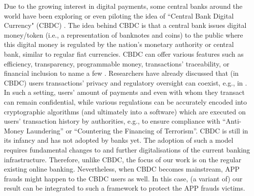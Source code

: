 Due to the growing interest in digital payments, some central banks around the world have been exploring or even piloting the idea of ``Central Bank Digital Currency" (CBDC) \cite{CBDC}.  The idea behind CBDC is that a central bank issues digital money/token (i.e., a representation of banknotes and coins) to the public where this digital money is regulated by the nation's monetary authority or central bank, similar to regular fiat currencies. CBDC can offer various features such as efficiency, transparency, programmable money, transactions' traceability, or financial inclusion to name a few \cite{CBDC,CBDC-core-features}. Researchers have already discussed that (in CBDC) users transactions' privacy and regulatory oversight can coexist, e.g., in \cite{WustKCC19,abs-2103-00254}. In such a setting, users' amount of payments and even with whom they transact can remain confidential, while  various regulations can be accurately encoded  into cryptographic algorithms (and ultimately into a software) which are executed on users' transaction history by  authorities, e.g., to ensure compliance with ``Anti-Money Laundering'' or ``Countering the Financing of Terrorism''.  CBDC is still in its infancy and has not adopted by banks yet. The adoption of such a model requires fundamental changes to and further digitalisations of the current banking  infrastructure. Therefore, unlike CBDC, the focus of our work is on the regular existing online banking.  Nevertheless, when CBDC becomes mainstream, APP frauds  might happen to the CBDC users as well. In this case, (a variant of) our result can be integrated to  such a framework to protect the APP frauds victims.  





